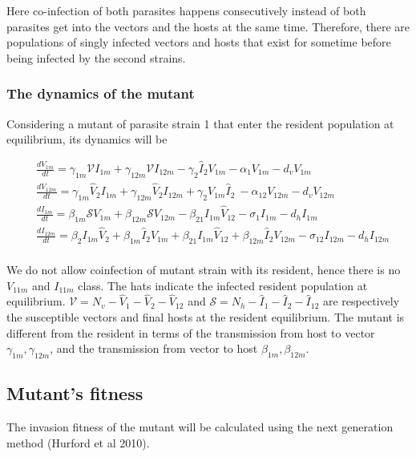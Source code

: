\documentclass{article}
\begin{document}
Here co-infection of both parasites happens consecutively instead of both parasites get into the vectors and the hosts at the same time. Therefore, there are populations of singly infected vectors and hosts that exist for sometime before being infected by the second strains. 

\subsubsection{The dynamics of the mutant}

Considering a mutant of parasite strain 1 that enter the resident population at equilibrium, its dynamics will be

\begin{align*}
& \frac{dV_{1m}}{dt} = \gamma_{1m}  \mathcal{V} I_{1m} + \gamma_{12m} \mathcal{V} I_{12m} - \gamma_2 \hat{I}_2 V_{1m} - \alpha_1 V_{1m}  - d_v V_{1m} \\
& \frac{dV_{12m}}{dt} = \gamma_{1m} \hat{V}_2 I_{1m} +  \gamma_{12m} \hat{V}_2 I_{12m} + \gamma_2 V_{1m} \hat{I}_2 \
- \alpha_{12} V_{12m} - d_v V_{12m} \\
& \frac{dI_{1m}}{dt} =  \beta_{1m} \mathcal{S} V_{1m}  + \beta_{12m} \mathcal{S} V_{12m}  - \beta_{21} I_{1m} \hat{V}_{12} - \sigma_1 I_{1m}  - d_h I_{1m} \\
& \frac{dI_{12m}}{dt} = \beta_2 I_{1m} \hat{V}_2 +  \beta_{1m}  \hat{I}_2 V_{1m} + \beta_{21} I_{1m} \hat{V}_{12}  + 
\beta_{12m} \hat{I}_2 V_{12m}  - \sigma_12 I_{12m} - d_h I_{12m} \\
\end{align*}

We do not allow coinfection of mutant strain with its resident, hence there is no $V_{11m}$ and $I_{11m}$ class. The hats indicate the infected resident population at equilibrium. $\mathcal{V} = N_v - \hat{V}_1 - \hat{V}_2 - \hat{V}_{12}$ and $\mathcal{S} = N_h -\hat{I}_1 - \hat{I}_2 - \hat{I}_{12}$ are respectively the susceptible vectors and final hosts at the resident equilibrium. The mutant is different from the resident in terms of the transmission from host to vector $\gamma_{1m}, \gamma_{12m}$, and the transmission from vector to host $\beta_{1m}, \beta_{12m}$.

\subsection{Mutant's fitness}
The invasion fitness of the mutant will be calculated using the next generation method (Hurford et al 2010).
\end{document}
